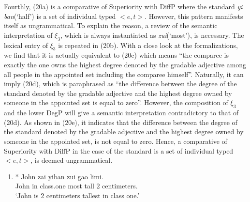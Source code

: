 \documentclass{ctexart}
\begin{document}
Fourthly, (20a) is a comparative of Superiority with DiffP where the standard \textit{yi ban}(`half') is a set of individual typed $<e,t>$. However, this pattern manifests itself as ungrammatical. To explain the reason, a review of the semantic interpretation of $\xi_3$, which is always instantiated as \textit{zui}(`most'), is necessary. The lexical entry of $\xi_3$ is repeated in (20b). With a close look at the formalizations, we find that it is actually equivalent to (20c) which means ``the comparee is exactly the one owns the highest degree denoted by the gradable adjective among all people in the appointed set including the comparee himself''. Naturally, it can imply (20d), which is paraphrased as ``the difference between the degree  of the standard denoted by the gradable adjective and the highest degree owned by someone in the appointed set is equal to zero''. However, the composition of $\xi_3$ and the lower DegP will give a semantic interpretation contradictory to that of (20d). As shown in (20e), it indicates that the difference between the degree of the standard denoted by the gradable adjective and the highest degree owned by someone in the appointed set, is not equal to zero. Hence, a comparative of Superiority with DiffP in the case of the standard is a set of individual typed $<e,t>$, is deemed ungrammatical.

\begin{enumerate}
    \item \label{maomao20_a}
    * John zai \enspace yiban \enspace \enspace zui \enspace gao \enspace \enspace {} limi. \\
    \hspace*{0.5em} John in \enspace class.one most tall 2 centimeters. \\
    \hspace*{0.5em} `John is 2 centimeters tallest in class one.'
\end{enumerate}
\end{document}
